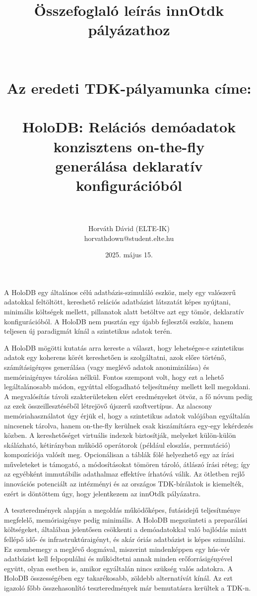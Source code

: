 \documentclass[12pt]{article}
\title{Összefoglaló leírás innOtdk pályázathoz \\ ~ \\ ~ \\ {\Large Az eredeti TDK-pályamunka címe: \\ ~ \\ HoloDB: Relációs demóadatok konzisztens on-the-fly \\ generálása deklaratív konfigurációból} \\ ~}
\author{Horváth Dávid (ELTE-IK) \\ horvathdown@student.elte.hu}
\date{2025. május 15.}
\begin{document}
\begin{titlepage}
\maketitle
\thispagestyle{empty}
\end{titlepage}

\cleardoublepage

A HoloDB egy általános célú adatbázis-szimuláló eszköz, mely egy valószerű adatokkal feltöltött, kereshető relációs adatbázist látszatát képes nyújtani, minimális költségek mellett,
pillanatok alatt betöltve azt egy tömör, deklaratív konfigurációból.
A HoloDB nem pusztán egy újabb fejlesztői eszköz, hanem teljesen új paradigmát kínál a szintetikus adatok terén.

A HoloDB mögötti kutatás arra kereste a választ, hogy lehetséges-e szintetikus adatok egy koherens körét kereshetően is szolgáltatni, azok előre történő, számításigényes generálása (vagy meglévő adatok anonimizálása) és memóriaigényes tárolása nélkül.
Fontos szempont volt, hogy ezt a lehető legáltalánosabb módon, egyúttal elfogadható teljesítmény mellett kell megoldani.
A megvalósítás távoli szakterületeken elért eredményeket ötvöz, a fő nóvum pedig az ezek összeillesztéséből létrejövő újszerű szoftvertípus.
Az alacsony memóriahasználatot úgy érjük el, hogy a szintetikus adatok valójában egyáltalán nincsenek tárolva, hanem on-the-fly kerülnek csak kiszámításra egy-egy lekérdezés közben.
A kereshetőséget virtuális indexek biztosítják, melyeket külön-külön skálázható, kétirányban működő operátorok (például eloszlás, permutáció) kompozíciója valósít meg.
Opcionálisan a táblák fölé helyezhető egy az írási műveleteket is támogató, a módosításokat tömören tároló, átlászó írási réteg;
így az egyébként immutábilis adathalmaz effektíve írhatóvá válik.
Az ötletben rejlő innovációs potenciált az intézményi és az országos TDK-bírálatok is kiemelték, ezért is döntöttem úgy, hogy jelentkezem az innOtdk pályázatra.

A teszteredmények alapján a megoldás működőképes, futásidejű teljesítménye megfelelő, memóriaigénye pedig minimális.
A HoloDB megszünteti a preparálási költségeket, általában jelentősen csökkenti a demóadatokkal való bajlódás miatt fellépő idő- és infrastruktúraigényt, és akár óriás adatbázist is képes szimulálni.
Ez szembemegy a meglévő dogmával, miszerint mindenképpen egy hús-vér adatbázist kell felpopulálni és működtetni annak minden erőforrásigényével együtt, olyan esetben is, amikor egyáltalán nincs szükség valós adatokra.
A HoloDB összességében egy takarékosabb, zöldebb alternatívát kínál.
Az ezt igazoló főbb összehasonlító teszteredmények már bemutatásra kerültek a TDK-n.
\end{document}
